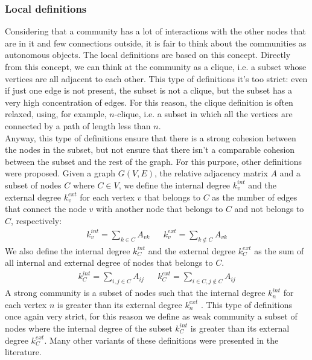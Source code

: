 \subsubsection{Local definitions}\label{local-def}
Considering that a community has a lot of interactions with the other nodes that are in it and few connections outside, it is fair to think about the communities as autonomous objects.
The local definitions are based on this concept. Directly from this concept, we can think at the community as a clique, i.e. a subset whose vertices are all adjacent to each other. This type of definitions it's too strict: even if just one edge is not present, the subset is not a clique, but the subset has a very high concentration of edges. For this reason, the clique definition is often relaxed, using, for example, $n$-clique, i.e. a subset in which all the vertices are connected by a path of length less than $n$.\\
Anyway, this type of definitions ensure that there is a strong cohesion between the nodes in the subset, but not ensure that there isn't a comparable cohesion between the subset and the rest of the graph. For this purpose, other definitions were proposed. 
Given a graph $G(V,E)$, the relative adjacency matrix $A$ and a subset of nodes $C$ where $C \in V$, we define the internal degree $k_v^{int}$ and the external degree $k_v^{ext}$ for each vertex $v$ that belongs to $C$ as the number of edges that connect the node $v$ with another node that belongs to $C$ and not belongs to $C$, respectively:
\begin{align}
k_v^{int}= \sum_{k \in C} A_{vk} && k_v^{ext}= \sum_{k \notin C} A_{vk}
\end{align}
We also define the internal degree $k_C^{int}$ and the external degree $k_C^{ext}$ as the sum of all internal and external degree of nodes that belongs to $C$. 
\begin{align}
k_C^{int}= \sum_{i,j \in C} A_{ij} && k_C^{ext}= \sum_{i\in C, j \notin C} A_{ij}
\end{align}
A strong community is a subset of nodes such that the internal degree $k_n^{int}$  for each vertex $n$ is greater than its external degree $k_n^{ext}$ . This type of definitions once again very strict, for this reason we define as weak community a subset of nodes where the internal degree of the subset  $k_C^{int}$ is greater than its external degree $k_C^{ext}$. Many other variants of these definitions were presented in the literature.
